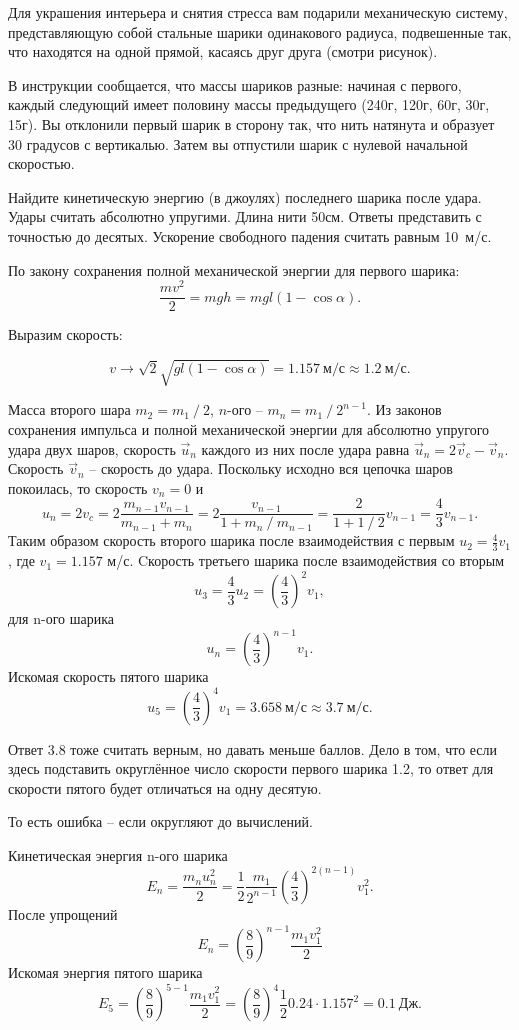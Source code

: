 
Для украшения интерьера и снятия стресса вам подарили механическую систему, 
представляющую собой стальные шарики одинакового радиуса, подвешенные так, что 
находятся на одной прямой, касаясь друг друга (смотри рисунок).


В инструкции сообщается, что массы шариков разные: начиная с первого, каждый следующий имеет 
половину массы предыдущего (240г, 120г, 60г, 30г, 15г). Вы отклонили первый шарик в сторону так, 
что нить натянута и образует 30 градусов с вертикалью. Затем вы отпустили шарик с 
нулевой начальной скоростью.

Найдите кинетическую энергию (в джоулях) последнего шарика после удара. Удары считать абсолютно упругими. Длина нити 50см. 
Ответы представить с точностью до десятых. Ускорение свободного падения считать равным 10~м/с.

\solutionSection

По закону сохранения полной механической энергии для первого шарика:
$$\frac{mv^2}{2} = mgh = mgl (1 - \cos \alpha).$$

Выразим скорость:

$$v \rightarrow \sqrt{2} \sqrt{g l (1 - \cos \alpha)} = 1.157 \: \text{м/с} \approx 1.2 \: \text{м/с}.$$

Масса второго шара $m_2=m_1⁄2$, $n$-ого – $m_n=m_1⁄2^{n-1}$. Из законов сохранения импульса и 
полной механической энергии для абсолютно упругого удара двух шаров, скорость $\overrightarrow{u}_n $ 
каждого из них после удара равна $\overrightarrow{u}_n=2 \overrightarrow{v}_c- \overrightarrow{v}_n$. 
Скорость $\overrightarrow{v}_n$ – скорость до удара. Поскольку исходно вся цепочка шаров покоилась, 
то скорость $v_n=0$ и
$$u_n=2v_c=2 \frac{m_{n-1} v_{n-1}}{m_{n-1}+m_n}=2 \frac{v_{n-1}}{1+m_n⁄m_{n-1}}=\frac{2}{1+1⁄2} v_{n-1}=\frac{4}{3} v_{n-1}.$$
Таким образом скорость второго шарика после взаимодействия с первым $u_2=\frac{4}{3} v_1$, где $v_1=1.157$ м/с. 
Cкорость третьего шарика после взаимодействия со вторым 
$$u_3=\frac{4}{3} u_2=\left(\frac{4}{3}\right)^2 v_1,$$
для n-ого шарика
$$u_n=\left(\frac{4}{3}\right)^{n-1}v_1.$$
Искомая скорость пятого шарика
$$u_5=\left(\frac{4}{3}\right)^4 v_1=3.658 \: \text{м/с} \approx 3.7 \: \text{м/с}.$$

Ответ 3.8 тоже считать верным, но давать меньше баллов. Дело в том, что если здесь подставить округлённое число скорости первого шарика 1.2, то ответ для скорости пятого будет отличаться на одну десятую. 

То есть ошибка – если округляют до вычислений.

Кинетическая энергия n-ого шарика
$$E_n=\frac{m_n u_n^2}{2}=\frac{1}{2} \frac{m_1}{2^{n-1}} \left(\frac{4}{3}\right)^{2(n-1)}v_1^2.$$
После упрощений
$$E_n=\left(\frac{8}{9}\right)^{n-1} \frac{m_1 v_1^2}{2}$$
Искомая энергия пятого шарика
$$E_5=\left(\frac{8}{9}\right)^{5-1}  \frac{m_1 v_1^2}{2}=\left(\frac{8}{9}\right)^4 \frac{1}{2} 0.24 \cdot 1.157^2=0.1 \: \text{Дж}.$$



